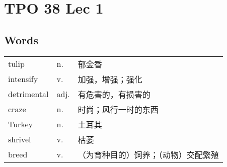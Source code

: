 \section{TPO 38 Lec 1}

\subsection{Words}

\begin{tabular}{lll}
    tulip       & n.   & 郁金香                \\
    intensify   & v.   & 加强，增强；强化           \\
    detrimental & adj. & 有危害的，有损害的          \\
    craze       & n.   & 时尚；风行一时的东西         \\
    Turkey      & n.   & 土耳其                \\
    shrivel     & v.   & 枯萎                 \\
    breed       & v.   & （为育种目的）饲养；（动物）交配繁殖 \\
\end{tabular}
